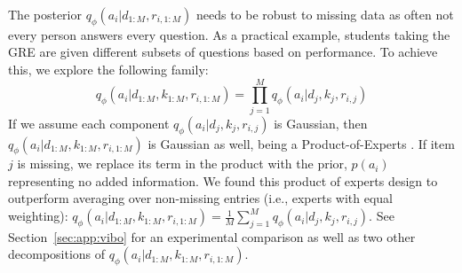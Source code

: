 The posterior $q_\phi(a_i|d_{1:M},r_{i,1:M})$ needs to be robust to missing data as often not every person answers every question.
As a practical example, students taking the GRE are given different subsets of questions based on performance.
To achieve this, we explore the following family:
\begin{equation}
    q_\phi(a_i|d_{1:M},k_{1:M},r_{i,1:M}) = \prod_{j=1}^M q_\phi(a_i|d_j,k_j,r_{i,j})
\end{equation}
If we assume each component $q_\phi(a_i|d_j,k_j,r_{i,j})$ is Gaussian, then $q_\phi(a_i|d_{1:M},k_{1:M},r_{i,1:M})$ is Gaussian as well, being a Product-of-Experts \cite{hinton1999products,wu2018multimodal}.
If item $j$ is missing, we replace its term in the product with the prior, $p(a_i)$ representing no added information.
We found this product of experts design to outperform averaging over non-missing entries (i.e., experts with equal weighting): $q_\phi(a_i|d_{1:M},k_{1:M},r_{i,1:M}) = \frac{1}{M}\sum_{j=1}^M q_\phi(a_i|d_j,k_j,r_{i,j})$.
See Section~\ref{sec:app:vibo} for an experimental comparison as well as two other decompositions of $q_\phi(a_i|d_{1:M},k_{1:M},r_{i,1:M})$.

